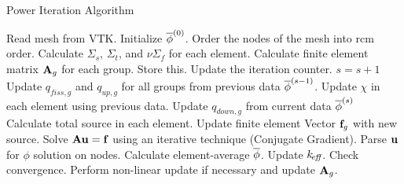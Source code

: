 \begin{frame}{Power Iteration Algorithm}

    \begin{algorithm}[H]
      \caption{\scriptsize General Iteration Scheme}
      \label{algorithm:general}
      \begin{algorithmic}[1]
      \State Read mesh from VTK.
      \State Initialize $\overline{\phi}^{(0)}$.
      \State Order the nodes of the mesh into \gls{rcm} order.
        \label{state:rcm}
      \State Calculate $\Sigma_s$, $\Sigma_t$, and $\nu \Sigma_f$ for each 
        element.
      \State Calculate finite element matrix $\mathbf{A}_g$ for each group. Store this. 
        \label{state:fem_matrix}
        \State Update the iteration counter. $s=s+1$
        \State Update $q_{fiss,g}$ and $q_{up,g}$ for all groups from previous 
          data $\overline{\phi}^{(s-1)}$.
        \State Update $\chi$ in each element using previous data.
          \label{state:chi_collapse}
          \State Update $q_{down,g}$ from current data $\overline{\phi}^{(s)}$
          \State Calculate total source in each element.
          \State Update finite element Vector $\mathbf{f}_g$ with new source.
            \label{state:fem_vector}
          \State Solve $\mathbf{A} \mathbf{u} = \mathbf{f}$ using an iterative technique (Conjugate
            Gradient).
          \State Parse $\mathbf{u}$ for $\phi$ solution on nodes.
          \State Calculate element-average $\overline{\phi}$.
        \EndFor
        \State Update $k_{\!\mbox{\scriptsize \em eff}}$.
        \State Check convergence.
        \State Perform non-linear update if necessary and update $\mathbf{A}_g$. 
          \label{state:nonlinear}
      \EndWhile
      \end{algorithmic}
    \end{algorithm}

\end{frame}
